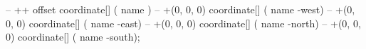  -- ++{{ offset }} coordinate[] ({{ name }}) 
-- +(0, 0, 0) coordinate[] ({{ name }}-west)
-- +(0, 0, 0) coordinate[] ({{ name }}-east)
-- +(0, 0, 0) coordinate[] ({{ name }}-north)
-- +(0, 0, 0) coordinate[] ({{ name }}-south);
